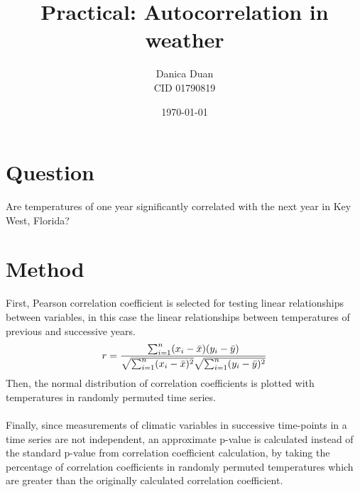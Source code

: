 \documentclass{article}
\title{Practical: Autocorrelation in weather}
\author{Danica Duan \\ CID 01790819}
\date{\today}
\begin{document}
\maketitle

\section*{Question}
Are temperatures of one year significantly correlated with the next year in Key West, Florida?

\section*{Method}
First, Pearson correlation coefficient\cite{freedman2007statistics} is selected for testing linear relationships between variables, in this case the linear relationships between temperatures of previous and successive years. 
\begin{align}
    \label{Pearson correlation} %
    r = 
    \frac{ \sum_{i=1}^{n}(x_i-\bar{x})(y_i-\bar{y}) }{%
        \sqrt{\sum_{i=1}^{n}(x_i-\bar{x})^2}\sqrt{\sum_{i=1}^{n}(y_i-\bar{y})^2}}
\end{align}
Then, the normal distribution of correlation coefficients is plotted with temperatures in randomly permuted time series.
\\
\\Finally, since measurements of climatic variables in successive time-points in a time series are not independent, an approximate p-value is calculated instead of the standard p-value from correlation coefficient calculation, by taking the percentage of correlation coefficients in randomly permuted temperatures which are greater than the originally calculated correlation coefficient. 
\end{document}
